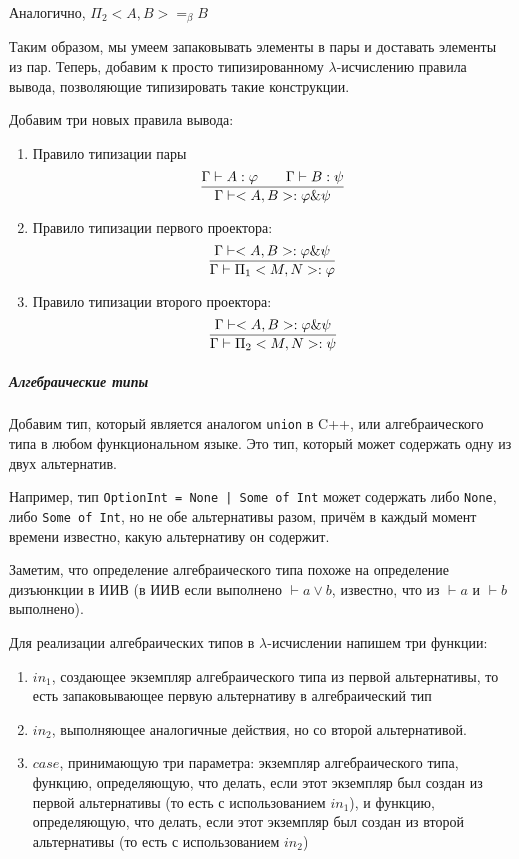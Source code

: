 Аналогично, $\Pi_2 <A, B> =_\beta B$

Таким образом, мы умеем запаковывать элементы в пары и доставать элементы из пар. Теперь, добавим к просто типизированному $\lambda$-исчислению правила вывода, позволяющие типизировать такие конструкции.

Добавим три новых правила вывода:

\begin{enumerate}
	\item Правило типизации пары
	\[
	\infer{\Gamma \vdash <A, B>: \varphi \text{\&} \psi}{\Gamma\vdash A: \varphi && \Gamma\vdash B: \psi}
	\]
	\item Правило типизации первого проектора:
	\[
	\infer{\Gamma \vdash \Pi_1 <M, N> : \varphi}{\Gamma \vdash <A, B>: \varphi \text{\&} \psi}
	\]
	
	\item Правило типизации второго проектора:
	\[
	\infer{\Gamma \vdash \Pi_2 <M, N> : \psi}{\Gamma \vdash <A, B>: \varphi \text{\&} \psi}
	\]
\end{enumerate}

\subparagraph{Алгебраические типы}

Добавим тип, который является аналогом \texttt{union} в C++, или алгебраического типа в любом функциональном языке. Это тип, который может содержать одну из двух альтернатив.

Например, тип \texttt{OptionInt = None | Some of Int} может содержать либо \texttt{None}, либо \texttt{Some of Int}, но не обе альтернативы разом, причём в каждый момент времени известно, какую альтернативу он содержит.

Заметим, что определение алгебраического типа похоже на определение дизъюнкции в ИИВ (в ИИВ если выполнено $\vdash a \vee b$, известно, что из $\vdash a$ и $\vdash b$ выполнено).

Для реализации алгебраических типов в $\lambda$-исчислении напишем три функции:

\begin{enumerate}
	\item $in_1$, создающее экземпляр алгебраического типа из первой альтернативы, то есть запаковывающее первую альтернативу в алгебраический тип
	
	\item $in_2$, выполняющее аналогичные действия, но со второй альтернативой.
	
	\item $case$, принимающую три параметра: экземпляр алгебраического типа, функцию, определяющую, что делать, если этот экземпляр был создан из первой альтернативы (то есть с использованием $in_1$), и функцию, определяющую, что делать, если этот экземпляр был создан из второй альтернативы (то есть с использованием $in_2$)
\end{enumerate}

